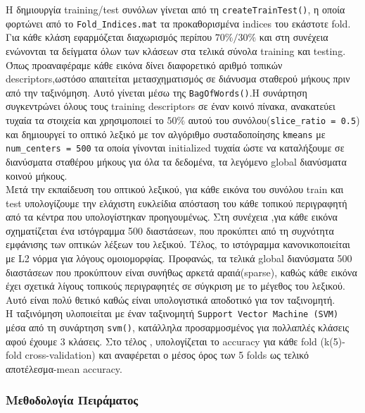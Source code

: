 \documentclass[12pt, a4paper]{article}
\begin{document}
Η δημιουργία training/test συνόλων γίνεται από τη \texttt{createTrainTest()},
η οποία φορτώνει από το \texttt{Fold\_Indices.mat} τα προκαθορισμένα indices
του εκάστοτε fold. Για κάθε κλάση εφαρμόζεται διαχωρισμός περίπου
$70\% / 30\%$ και στη συνέχεια ενώνονται τα δείγματα όλων των κλάσεων στα
τελικά σύνολα training και testing.\\
Όπως προαναφέραμε κάθε εικόνα δίνει διαφορετικό αριθμό τοπικών descriptors,ωστόσο απαιτείται
μετασχηματισμός σε διάνυσμα σταθερού μήκους πριν από την ταξινόμηση. Αυτό
γίνεται μέσω της \texttt{BagOfWords()}.Η συνάρτηση συγκεντρώνει όλους τους
training descriptors σε έναν κοινό πίνακα, ανακατεύει τυχαία τα στοιχεία και
χρησιμοποιεί το $50\%$ αυτού του συνόλου(\texttt{slice\_ratio = 0.5}) και δημιουργεί
το οπτικό λεξικό με τον αλγόριθμο συσταδοποίησης \texttt{kmeans}  με \texttt{num\_centers = 500} τα οποία γίνονται initialized  τυχαία ώστε να καταλήξουμε σε διανύσματα σταθέρου μήκους για όλα τα δεδομένα, τα λεγόμενο global διανύσματα κοινού
μήκους.\\

Μετά την εκπαίδευση του οπτικού λεξικού, για κάθε εικόνα του συνόλου train και test υπολογίζουμε την ελάχιστη ευκλείδια
απόσταση του κάθε τοπικού περιγραφητή από τα κέντρα που υπολογίστηκαν προηγουμένως. Στη συνέχεια ,για κάθε εικόνα σχηματίζεται ένα ιστόγραμμα 500 διαστάσεων,
που προκύπτει από τη συχνότητα εμφάνισης των οπτικών λέξεων του λεξικού. Τέλος, το ιστόγραμμα κανονικοποιείται με L2 νόρμα για λόγους ομοιομορφίας. Προφανώς, τα τελικά global διανύσματα 500 διαστάσεων που προκύπτουν είναι συνήθως 
αρκετά αραιά(sparse), καθώς κάθε εικόνα έχει σχετικά λίγους τοπικούς περιγραφητές σε σύγκριση με το μέγεθος του λεξικού. Αυτό είναι πολύ θετικό καθώς είναι υπολογιστικά αποδοτικό για τον ταξινομητή.\\

Η ταξινόμηση υλοποιείται με έναν ταξινομητή  \texttt{Support Vector Machine (SVM)} μέσα από τη συνάρτηση \texttt{svm()}, κατάλληλα προσαρμοσμένος για πολλαπλές κλάσεις
αφού έχουμε 3 κλάσεις. Στο τέλος , υπολογίζεται το accuracy για κάθε fold (k(5)-fold cross-validation) και αναφέρεται ο μέσος όρος των 5 folds ως τελικό αποτέλεσμα-mean accuracy.

\subsubsection{Μεθοδολογία Πειράματος}
\end{document}
